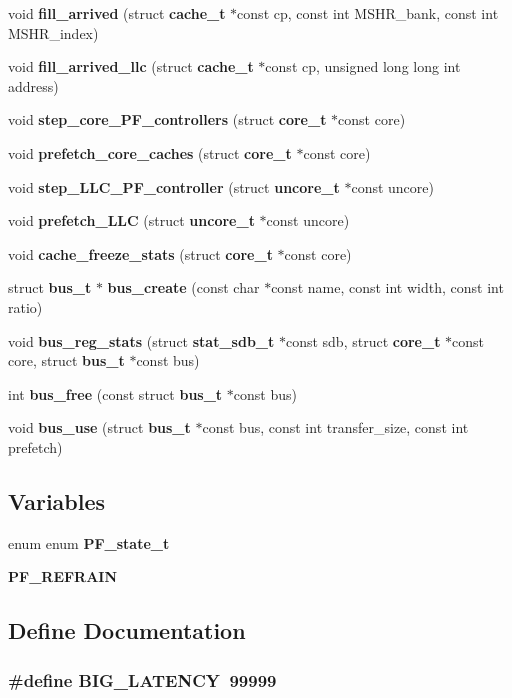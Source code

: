 \begin{CompactItemize}
\item 
void {\bf fill\_\-arrived} (struct {\bf cache\_\-t} $\ast$const cp, const int MSHR\_\-bank, const int MSHR\_\-index)
\item 
void {\bf fill\_\-arrived\_\-llc} (struct {\bf cache\_\-t} $\ast$const cp, unsigned long long int address)
\item 
void {\bf step\_\-core\_\-PF\_\-controllers} (struct {\bf core\_\-t} $\ast$const core)
\item 
void {\bf prefetch\_\-core\_\-caches} (struct {\bf core\_\-t} $\ast$const core)
\item 
void {\bf step\_\-LLC\_\-PF\_\-controller} (struct {\bf uncore\_\-t} $\ast$const uncore)
\item 
void {\bf prefetch\_\-LLC} (struct {\bf uncore\_\-t} $\ast$const uncore)
\item 
void {\bf cache\_\-freeze\_\-stats} (struct {\bf core\_\-t} $\ast$const core)
\item 
struct {\bf bus\_\-t} $\ast$ {\bf bus\_\-create} (const char $\ast$const name, const int width, const int ratio)
\item 
void {\bf bus\_\-reg\_\-stats} (struct {\bf stat\_\-sdb\_\-t} $\ast$const sdb, struct {\bf core\_\-t} $\ast$const core, struct {\bf bus\_\-t} $\ast$const bus)
\item 
int {\bf bus\_\-free} (const struct {\bf bus\_\-t} $\ast$const bus)
\item 
void {\bf bus\_\-use} (struct {\bf bus\_\-t} $\ast$const bus, const int transfer\_\-size, const int prefetch)
\end{CompactItemize}
\subsection*{Variables}
\begin{CompactItemize}
\item 
enum enum {\bf PF\_\-state\_\-t}
\item 
{\bf PF\_\-REFRAIN}
\end{CompactItemize}


\subsection{Define Documentation}
\subsubsection[{BIG\_\-LATENCY}]{\setlength{\rightskip}{0pt plus 5cm}\#define BIG\_\-LATENCY~99999}\label{config_2zesto-cache_8h_8d2ff015ca2239311fb6533186242f9e}




